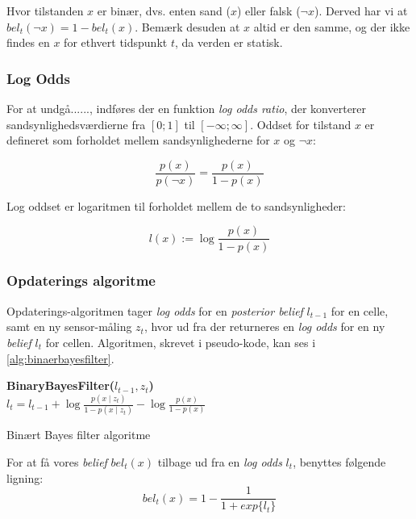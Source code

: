Hvor tilstanden $x$ er binær, dvs. enten sand ($x$) eller falsk ($\lnot x$).
Derved har vi at $bel_t(\lnot x) = 1 - bel_t(x)$.
Bemærk desuden at $x$ altid er den samme, og der ikke findes en $x$ for ethvert tidspunkt $t$, da verden er statisk.

\subsubsection{Log Odds}
For at undgå......, indføres der en funktion \textit{log odds ratio}, der konverterer sandsynlighedsværdierne fra $[0;1]$ til $[-\infty;\infty]$.
Oddset for tilstand $x$ er defineret som forholdet mellem sandsynlighederne for $x$ og $\lnot x$:

\begin{equation}
\frac{p(x)}{p(\lnot x)} = \frac{p(x)}{1 - p(x)}
\end{equation}

Log oddset er logaritmen til forholdet mellem de to sandsynligheder:

\begin{equation}
l(x) := \log \frac{p(x)}{1 - p(x)}
\end{equation}

\subsubsection{Opdaterings algoritme}
Opdaterings-algoritmen tager \textit{log odds} for en \textit{posterior belief} $l_{t-1}$ for en celle, samt en ny sensor-måling $z_t$, hvor ud fra der returneres en \textit{log odds} for en ny \textit{belief} $l_t$ for cellen.
Algoritmen, skrevet i pseudo-kode, kan ses i \cref{alg:binaerbayesfilter}.

\begin{algorithm}[h]
\textbf{BinaryBayesFilter($l_{t-1}, z_t$)} \\
\Indp $l_t = l_{t-1} + \log \frac{p(x \mid z_t)}{1-p(x \mid z_t)} - \log \frac{p(x)}{1-p(x)}$ \\
\caption{Binært Bayes filter algoritme}
\label{alg:binaerbayesfilter}
\end{algorithm}


For at få vores \textit{belief} $bel_t(x)$ tilbage ud fra en \textit{log odds} $l_t$, benyttes følgende ligning:
\begin{equation}
bel_t(x) = 1 - \frac{1}{1 + exp\{l_t\}}
\end{equation}
